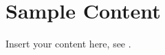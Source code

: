 \chapter{Sample Content}


Insert your content here, see \cite{Michel2018,ENSDF,sample.book,SampleComment,TDRSample}. 







